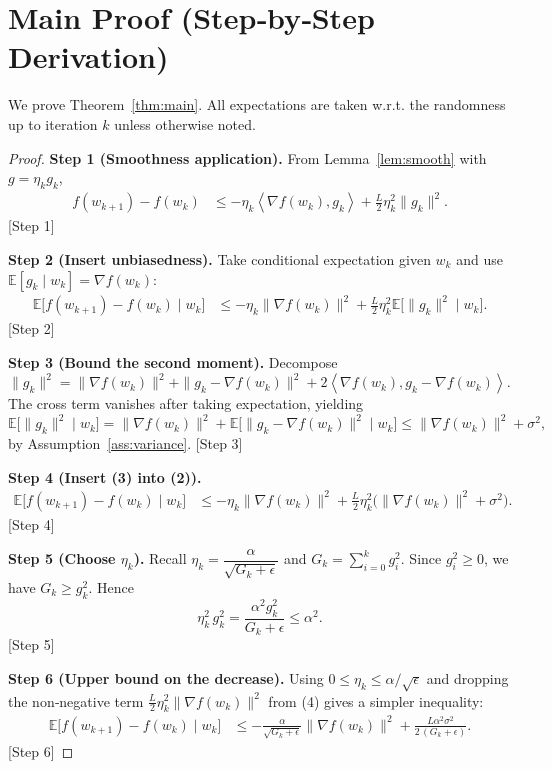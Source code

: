 \documentclass{article}
\newcommand{\E}{\mathbb{E}}
\newcommand{\inner}[2]{\left\langle #1,#2\right\rangle}
\begin{document}
\section*{Main Proof (Step‑by‑Step Derivation)}
We prove Theorem~\ref{thm:main}. All expectations are taken w.r.t. the randomness up to iteration $k$ unless otherwise noted.

\begin{proof}
\textbf{Step 1 (Smoothness application).}  
From Lemma~\ref{lem:smooth} with $g=\eta_k g_k$,
\begin{align}
f(w_{k+1})-f(w_k)
&\le -\eta_k\inner{\nabla f(w_k)}{g_k}+\frac{L}{2}\eta_k^{2}\|g_k\|^{2}. \tag{1}
\end{align}
[Step 1]

\textbf{Step 2 (Insert unbiasedness).}  
Take conditional expectation given $w_k$ and use $\E[g_k\mid w_k]=\nabla f(w_k)$:
\begin{align}
\E\!\big[f(w_{k+1})-f(w_k)\mid w_k\big]
&\le -\eta_k\|\nabla f(w_k)\|^{2}
+\frac{L}{2}\eta_k^{2}\E\!\big[\|g_k\|^{2}\mid w_k\big]. \tag{2}
\end{align}
[Step 2]

\textbf{Step 3 (Bound the second moment).}  
Decompose $\|g_k\|^{2}=\|\nabla f(w_k)\|^{2}+\|g_k-\nabla f(w_k)\|^{2}+2\inner{\nabla f(w_k)}{g_k-\nabla f(w_k)}$. The cross term vanishes after taking expectation, yielding
\[
\E\!\big[\|g_k\|^{2}\mid w_k\big]=\|\nabla f(w_k)\|^{2}+\E\!\big[\|g_k-\nabla f(w_k)\|^{2}\mid w_k\big]
\le \|\nabla f(w_k)\|^{2}+\sigma^{2}, \tag{3}
\]
by Assumption~\ref{ass:variance}.  
[Step 3]

\textbf{Step 4 (Insert (3) into (2)).}
\begin{align}
\E\!\big[f(w_{k+1})-f(w_k)\mid w_k\big]
&\le -\eta_k\|\nabla f(w_k)\|^{2}
+\frac{L}{2}\eta_k^{2}\big(\|\nabla f(w_k)\|^{2}+\sigma^{2}\big). \tag{4}
\end{align}
[Step 4]

\textbf{Step 5 (Choose $\eta_k$).}  
Recall $\eta_k=\dfrac{\alpha}{\sqrt{G_k+\epsilon}}$ and $G_k=\sum_{i=0}^{k} g_i^{2}$. Since $g_i^{2}\ge0$, we have $G_k\ge g_k^{2}$. Hence
\[
\eta_k^{2}\,g_k^{2}= \frac{\alpha^{2}g_k^{2}}{G_k+\epsilon}\le \alpha^{2}. \tag{5}
\]
[Step 5]

\textbf{Step 6 (Upper bound on the decrease).}  
Using $0\le \eta_k\le\alpha/\sqrt{\epsilon}$ and dropping the non‑negative term $\frac{L}{2}\eta_k^{2}\|\nabla f(w_k)\|^{2}$ from (4) gives a simpler inequality:
\begin{align}
\E\!\big[f(w_{k+1})-f(w_k)\mid w_k\big]
&\le -\frac{\alpha}{\sqrt{G_k+\epsilon}}\|\nabla f(w_k)\|^{2}
+\frac{L\alpha^{2}\sigma^{2}}{2\,(G_k+\epsilon)}. \tag{6}
\end{align}
[Step 6]


\end{proof}
\end{document}
